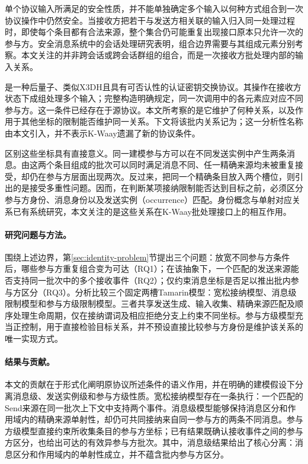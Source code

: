 单个协议输入所满足的安全性质，并不能单独确定多个输入以何种方式组合到一次协议操作中仍然安全。当接收方把若干与发送方相关联的输入归入同一处理过程时，即使每个条目都有合法来源，整个集合仍可能重复出现接口原本只允许一次的参与方。安全消息系统中的会话处理研究表明，组合边界需要与其组成元素分别考察\cite{cremers2023session}。本文关注的并非跨会话或跨会话群组的组合，而是一次接收方批处理内部的输入关系。

\kwaay 是一种后量子、类似X3DH且具有可否认性的认证密钥交换协议\cite{collins2024kwaay}。其\batchreceive 操作在接收方状态下成组处理多个输入；完整构造明确规定，同一次调用中的各元素应对应不同参与方\cite[第5.1节，第21页]{collins2024kwaayfull}。这一条件已经存在于源协议。本文所考察的是它维护了何种关系，以及作用于其他坐标的限制能否维护同一关系。下文将该批内关系记为\distinctparty；这一分析性名称由本文引入，并不表示K-Waay遗漏了新的协议条件。

区别这些坐标具有直接意义。同一建模参与方可以在不同发送实例中产生两条消息。由这两个条目组成的批次可以同时满足消息不同、任一精确来源均未被重复接受，却仍在参与方层面出现两次。反过来，把同一个精确条目放入两个槽位，则引出的是接受多重性问题。因而，在判断某项接纳限制能否达到目标之前，必须区分参与方身份、消息身份以及发送实例（occurrence）匹配。身份概念与单射对应关系已有系统研究\cite{lupetti2006names,lowe1997hierarchy}，本文关注的是这些关系在K-Waay批处理接口上的相互作用。

\paragraph{研究问题与方法。}
围绕上述边界，第\ref{sec:identity-problem}节提出三个问题：放宽不同参与方条件后，哪些参与方重复组合变为可达（RQ1）；在该抽象下，一个匹配的发送来源能否支持同一批次中的多个接收事件（RQ2）；仅约束消息坐标是否足以推出批内参与方区分（RQ3）。分析比较三个固定两槽Tamarin模型\cite{meier2013tamarin}：宽松接纳模型、消息级限制模型和参与方级限制模型。三者共享发送生成、输入收集、精确来源匹配及顺序处理生命周期，仅在接纳谓词及相应拒绝分支上约束不同坐标。参与方级模型充当正控制，用于直接检验目标关系，并不预设直接比较参与方身份是维护该关系的唯一实现方式。

\paragraph{结果与贡献。}
本文的贡献在于形式化阐明原协议所述条件的语义作用，并在明确的建模假设下分离消息级、发送实例级和参与方级性质。宽松接纳模型存在一条执行：一个匹配的\textsf{Send}来源在同一批次上下文中支持两个\receiveraccept 事件。消息级模型能够保持消息区分和作用域内的精确来源单射性，却仍可共同接纳来自同一参与方的两条不同消息。参与方级模型直接约束所收集条目的参与方坐标；已有结果既确认接收事件之间的参与方区分，也给出可达的有效异参与方批次。其中，消息级结果给出了核心分离：消息区分和作用域内的单射性成立，并不蕴含批内参与方区分。

